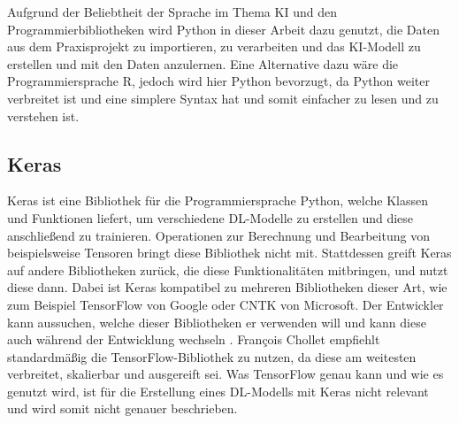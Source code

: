 Aufgrund der Beliebtheit der Sprache im Thema \ac{KI} und den Programmierbibliotheken wird Python in dieser Arbeit dazu genutzt,
die Daten aus dem Praxisprojekt zu importieren, zu verarbeiten und das \ac{KI}-Modell zu erstellen und mit den Daten anzulernen.
Eine Alternative dazu wäre die Programmiersprache R, jedoch wird hier Python bevorzugt, da Python weiter verbreitet ist und eine simplere Syntax hat und somit 
einfacher zu lesen und zu verstehen ist.

\subsection{Keras}
\label{chap:Keras}
Keras ist eine Bibliothek für die Programmiersprache Python, welche Klassen und Funktionen liefert, um verschiedene \ac{DL}-Modelle zu erstellen
und diese anschließend zu trainieren. Operationen zur Berechnung und Bearbeitung von beispielsweise Tensoren bringt diese Bibliothek nicht mit.
Stattdessen greift Keras auf andere Bibliotheken zurück, die diese Funktionalitäten mitbringen, und nutzt diese dann. Dabei ist Keras kompatibel zu mehreren
Bibliotheken dieser Art, wie zum Beispiel TensorFlow von Google oder CNTK von Microsoft. Der Entwickler kann aussuchen, welche dieser Bibliotheken er
verwenden will und kann diese auch während der Entwicklung wechseln \cite[vgl. S.89ff.]{DL_PY}. François Chollet empfiehlt standardmäßig die TensorFlow-Bibliothek zu nutzen, da diese 
\glqq am weitesten verbreitet, skalierbar und ausgereift\grqq{} \cite[S.91]{DL_PY} sei. Was TensorFlow genau kann und wie es genutzt wird, ist für die Erstellung eines
\ac{DL}-Modells mit Keras nicht relevant und wird somit nicht genauer beschrieben.

